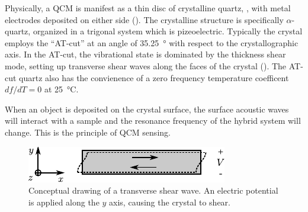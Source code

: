 Physically, a QCM is manifest as a thin disc of crystalline quartz,
, with metal electrodes deposited on either side
().  The crystalline structure is specifically
$\alpha$-quartz, organized in a trigonal system which is pizeoelectric.
Typically the crystal employs the ``AT-cut'' at an angle of
\SI{35.25}{\degree} with respect to the crystallographic axis.  In the
AT-cut, the vibrational state is dominated by the thickness shear mode,
setting up transverse shear waves along the faces of the crystal
().  The AT-cut quartz also has the convienence of
a zero frequency temperature coefficent $df/dT=0$ at \SI{25}{\celsius}.

When an object is deposited on the crystal surface, the surface acoustic
waves will interact with a sample and the resonance frequency of the hybrid
system will change.  This is the principle of QCM sensing.
\begin{figure}[ht]
 \centering
 	\includegraphics[keepaspectratio]{qcm/figures/qcm_shearmode.pdf}
	\caption{Conceptual drawing of a transverse shear wave.  An electric
	potential is applied along the $y$ axis, causing the crystal to
	shear.}
 \label{fig:qcmshearwave}
\end{figure}
